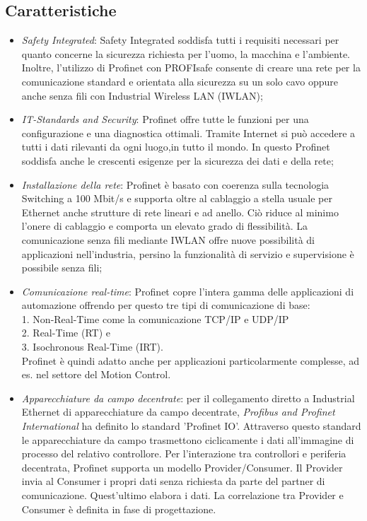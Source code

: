 \documentclass[12pt, a4paper, oneside]{book}
\begin{document}
\subsection{Caratteristiche}
\begin{itemize}
	\item \textit{Safety Integrated}: Safety Integrated soddisfa tutti i requisiti	necessari per quanto concerne la sicurezza richiesta per l’uomo, la macchina e l’ambiente. Inoltre, l’utilizzo di Profinet con PROFIsafe consente di creare una rete per la comunicazione standard e orientata alla sicurezza su un solo cavo oppure anche senza fili con Industrial Wireless LAN (IWLAN);
	\item \textit{IT-Standards and Security}: Profinet offre tutte le funzioni per una configurazione e una diagnostica ottimali. Tramite Internet si può accedere a tutti i dati rilevanti da ogni luogo,in tutto il mondo. In questo Profinet soddisfa anche le crescenti esigenze per la sicurezza dei dati e della rete;
	\item \textit{Installazione della rete}: Profinet è basato con coerenza sulla tecnologia Switching a 100 Mbit/s e supporta oltre al cablaggio a stella usuale per Ethernet anche strutture di rete lineari e ad anello. Ciò riduce al minimo l’onere di cablaggio e comporta un elevato grado di flessibilità. La comunicazione senza fili mediante IWLAN offre nuove possibilità di applicazioni nell’industria, persino la funzionalità di servizio e supervisione è possibile senza fili;
	\item \textit{Comunicazione real-time}: Profinet copre l’intera gamma delle applicazioni di automazione offrendo per questo tre tipi di comunicazione di base:
	\\1. Non-Real-Time come la comunicazione TCP/IP e UDP/IP
	\\2. Real-Time (RT) e
	\\3. Isochronous Real-Time (IRT). 
	\\Profinet è quindi adatto anche per applicazioni particolarmente complesse, ad es. nel settore del Motion Control.
	\item \textit{Apparecchiature da campo decentrate}: per il collegamento diretto a Industrial Ethernet di apparecchiature da campo decentrate, \textit{Profibus and Profinet International} ha definito lo standard 'Profinet IO'. Attraverso questo standard le apparecchiature da campo trasmettono ciclicamente i dati all’immagine di processo del relativo controllore. Per l’interazione tra controllori e periferia decentrata, Profinet supporta un modello Provider/Consumer. Il Provider invia al Consumer i propri dati senza richiesta da parte del partner di comunicazione. Quest’ultimo elabora i dati. La correlazione tra Provider e Consumer è definita in fase di progettazione.

\end{itemize}
\end{document}
